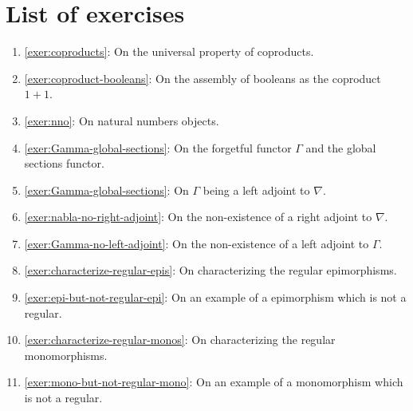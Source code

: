 \section{List of exercises}
\begin{enumerate}
\item \cref{exer:coproducts}: On the universal property of coproducts.
\item \cref{exer:coproduct-booleans}: On the assembly of booleans as the
  coproduct \(1 + 1\).
\item \cref{exer:nno}: On natural numbers objects.
\item \cref{exer:Gamma-global-sections}: On the forgetful functor \(\Gamma\) and
  the global sections functor.
\item \cref{exer:Gamma-global-sections}: On \(\Gamma\) being a left adjoint to
  \(\nabla\).
\item \cref{exer:nabla-no-right-adjoint}: On the non-existence of a right
  adjoint to \(\nabla\).
\item \cref{exer:Gamma-no-left-adjoint}: On the non-existence of a left
  adjoint to \(\Gamma\).
\item \cref{exer:characterize-regular-epis}: On characterizing the regular
  epimorphisms.
\item \cref{exer:epi-but-not-regular-epi}: On an example of a epimorphism
  which is not a regular.
\item \cref{exer:characterize-regular-monos}: On characterizing the regular
  monomorphisms.
\item \cref{exer:mono-but-not-regular-mono}: On an example of a monomorphism
  which is not a regular.
\end{enumerate}

